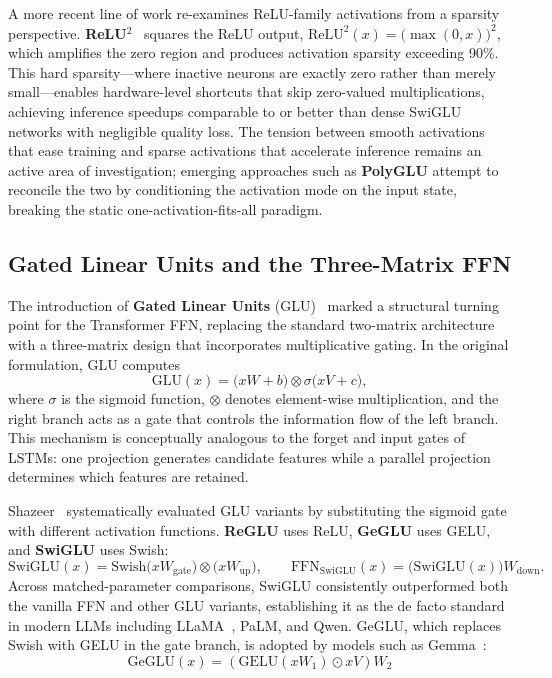 A more recent line of work re-examines ReLU-family activations from a sparsity perspective.
\textbf{ReLU$^2$}~\cite{zhang2024relu2} squares the ReLU output, $\mathrm{ReLU}^2(x)=\bigl(\max(0,x)\bigr)^2$, which amplifies the zero region and produces activation sparsity exceeding 90\%.
This hard sparsity---where inactive neurons are exactly zero rather than merely small---enables hardware-level shortcuts that skip zero-valued multiplications, achieving inference speedups comparable to or better than dense SwiGLU networks with negligible quality loss.
The tension between smooth activations that ease training and sparse activations that accelerate inference remains an active area of investigation; emerging approaches such as \textbf{PolyGLU} attempt to reconcile the two by conditioning the activation mode on the input state, breaking the static one-activation-fits-all paradigm.


\subsection{Gated Linear Units and the Three-Matrix FFN}
\label{subsec:glu}

The introduction of \textbf{Gated Linear Units} (GLU)~\cite{dauphin2017language} marked a structural turning point for the Transformer FFN, replacing the standard two-matrix architecture with a three-matrix design that incorporates multiplicative gating.
In the original formulation, GLU computes
\begin{equation}
\label{eq:glu}
\mathrm{GLU}(x) = \bigl(x W + b\bigr) \otimes \sigma\!\bigl(x V + c\bigr),
\end{equation}
where $\sigma$ is the sigmoid function, $\otimes$ denotes element-wise multiplication, and the right branch acts as a gate that controls the information flow of the left branch.
This mechanism is conceptually analogous to the forget and input gates of LSTMs: one projection generates candidate features while a parallel projection determines which features are retained.

Shazeer~\cite{shazeer2020glu} systematically evaluated GLU variants by substituting the sigmoid gate with different activation functions.
\textbf{ReGLU} uses ReLU, \textbf{GeGLU} uses GELU, and \textbf{SwiGLU} uses Swish:
\begin{equation}
\label{eq:swiglu}
\mathrm{SwiGLU}(x) = \mathrm{Swish}\!\bigl(x W_{\mathrm{gate}}\bigr) \otimes \bigl(x W_{\mathrm{up}}\bigr), \qquad
\mathrm{FFN}_{\mathrm{SwiGLU}}(x) = \bigl(\mathrm{SwiGLU}(x)\bigr) W_{\mathrm{down}}.
\end{equation}
Across matched-parameter comparisons, SwiGLU consistently outperformed both the vanilla FFN and other GLU variants, establishing it as the de facto standard in modern LLMs including LLaMA~\cite{touvron2023llama}, PaLM, and Qwen.
GeGLU, which replaces Swish with GELU in the gate branch, is adopted by models such as Gemma~\cite{gemma2024improving}:
\begin{equation}
\mathrm{GeGLU}(x) = \left(\mathrm{GELU}(x W_1) \odot x V\right) W_2
\label{eq:geglu}
\end{equation}

